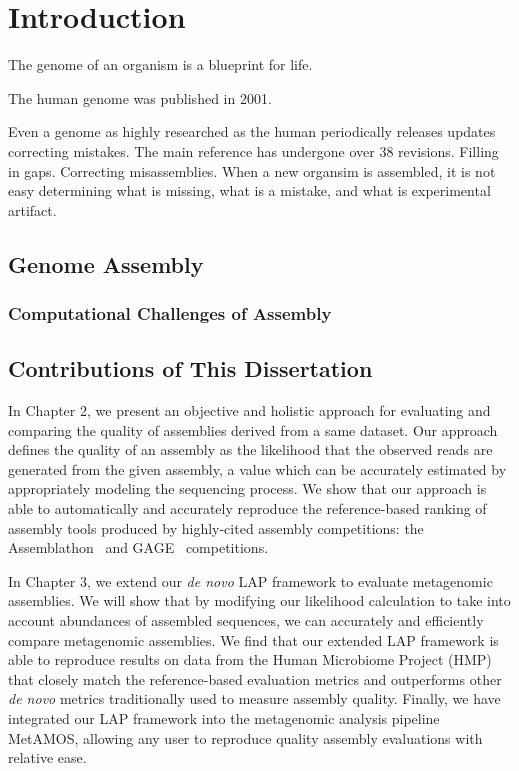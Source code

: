 
\newcommand{\edit}[1]{\textcolor{black}{#1}}

\renewcommand{\thechapter}{1}

\chapter{Introduction}

The genome of an organism is a blueprint for life.

The human genome was published in 2001.

Even a genome as highly researched as the human periodically releases updates correcting mistakes.
The main reference has undergone over 38 revisions.
Filling in gaps.
Correcting misassemblies.
When a new organsim is assembled, it is not easy determining what is missing, what is a mistake, and what is experimental artifact.



\section{Genome Assembly}

\subsection{Computational Challenges of Assembly}


\section{Contributions of This Dissertation}

In Chapter 2, we present an objective and holistic approach for evaluating and
comparing the quality of assemblies derived from a same dataset.  Our
approach defines the quality of an assembly as the likelihood that the
observed reads are generated from the given assembly, a value which can
be accurately estimated by appropriately modeling the sequencing
process. We show that our approach is able to automatically and accurately reproduce the
reference-based ranking of assembly tools produced by highly-cited assembly competitions: the
Assemblathon~\cite{earl2011assemblathon} and GAGE~\cite{salzberg2011gage}
competitions.

In Chapter 3, we extend our \emph{de novo} LAP framework to evaluate metagenomic assemblies.
We will show that by modifying our likelihood calculation to take into account abundances of assembled sequences, we can accurately and efficiently compare metagenomic assemblies.
We find that our extended LAP framework is able to reproduce results on data from the Human Microbiome Project (HMP) that closely match the reference-based evaluation metrics and outperforms other \emph{de novo} metrics traditionally used to measure assembly quality.
Finally, we have integrated our LAP framework into the metagenomic analysis pipeline MetAMOS, allowing any user to reproduce quality assembly evaluations with relative ease.

